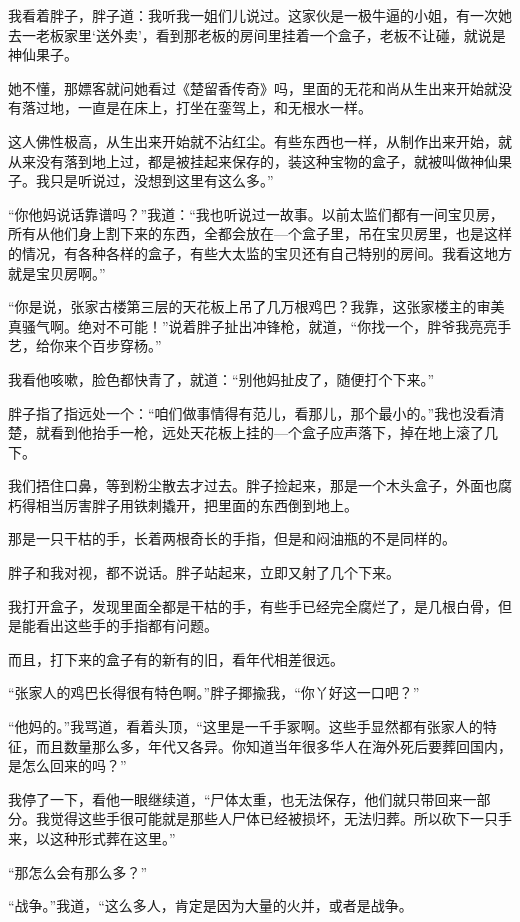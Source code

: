 我看着胖子，胖子道：我听我一姐们儿说过。这家伙是一极牛逼的小姐，有一次她去一老板家里‘送外卖’，看到那老板的房间里挂着一个盒子，老板不让碰，就说是神仙果子。

她不懂，那嫖客就问她看过《楚留香传奇》吗，里面的无花和尚从生出来开始就没有落过地，一直是在床上，打坐在銮驾上，和无根水一样。

这人佛性极高，从生出来开始就不沾红尘。有些东西也一样，从制作出来开始，就从来没有落到地上过，都是被挂起来保存的，装这种宝物的盒子，就被叫做神仙果子。我只是听说过，没想到这里有这么多。”

“你他妈说话靠谱吗？”我道：“我也听说过一故事。以前太监们都有一间宝贝房，所有从他们身上割下来的东西，全都会放在—个盒子里，吊在宝贝房里，也是这样的情况，有各种各样的盒子，有些大太监的宝贝还有自己特别的房间。我看这地方就是宝贝房啊。”

“你是说，张家古楼第三层的天花板上吊了几万根鸡巴？我靠，这张家楼主的审美真骚气啊。绝对不可能！”说着胖子扯出冲锋枪，就道，“你找一个，胖爷我亮亮手艺，给你来个百步穿杨。”

我看他咳嗽，脸色都快青了，就道：“别他妈扯皮了，随便打个下来。”

胖子指了指远处一个：“咱们做事情得有范儿，看那儿，那个最小的。”我也没看清楚，就看到他抬手一枪，远处天花板上挂的—个盒子应声落下，掉在地上滚了几下。

我们捂住口鼻，等到粉尘散去才过去。胖子捡起来，那是一个木头盒子，外面也腐朽得相当厉害胖子用铁刺撬开，把里面的东西倒到地上。

那是一只干枯的手，长着两根奇长的手指，但是和闷油瓶的不是同样的。

胖子和我对视，都不说话。胖子站起来，立即又射了几个下来。

我打开盒子，发现里面全都是干枯的手，有些手已经完全腐烂了，是几根白骨，但是能看出这些手的手指都有问题。

而且，打下来的盒子有的新有的旧，看年代相差很远。

“张家人的鸡巴长得很有特色啊。”胖子揶揄我，“你丫好这一口吧？”

“他妈的。”我骂道，看着头顶，“这里是一千手冢啊。这些手显然都有张家人的特征，而且数量那么多，年代又各异。你知道当年很多华人在海外死后要葬回国内，是怎么回来的吗？”

我停了一下，看他一眼继续道，“尸体太重，也无法保存，他们就只带回来一部分。我觉得这些手很可能就是那些人尸体已经被损坏，无法归葬。所以砍下一只手来，以这种形式葬在这里。”

“那怎么会有那么多？”

“战争。”我道，“这么多人，肯定是因为大量的火并，或者是战争。

